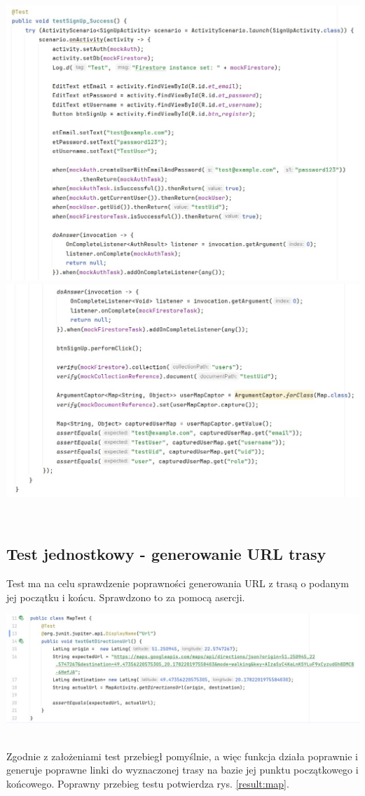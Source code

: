 \noindent
\begin{minipage}{\linewidth}
    \label{test:signup}
    \centering
    \includegraphics[width=0.8\linewidth]{img/test/test-signup1.jpg}
    \includegraphics[width=0.8\linewidth]{img/test/test-signup2.jpg}
\end{minipage}
\\



\subsection*{Test jednostkowy - generowanie URL trasy}
Test ma na celu sprawdzenie poprawności generowania URL z trasą o podanym jej początku i końcu. Sprawdzono to za pomocą asercji.\\
\noindent
\begin{minipage}{\linewidth}
    \label{test:map}
    \centering
    \includegraphics[width=0.8\linewidth]{img/test/testmap.jpg}
\end{minipage}
\\
Zgodnie z założeniami test przebiegł pomyślnie, a więc funkcja działa poprawnie i generuje poprawne linki do wyznaczonej trasy na bazie jej punktu początkowego i końcowego. Poprawny przebieg testu potwierdza rys. \ref{result:map}. \\

